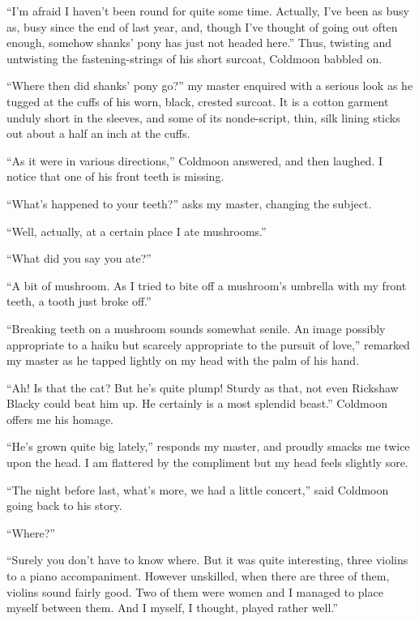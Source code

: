 \documentclass[12pt, openright]{book}
\begin{document}
``I'm afraid I haven't been round for quite some time. Actually, I've
been as busy as, busy since the end of last year, and, though I've
thought of going out often enough, somehow shanks' pony has just not
headed here.'' Thus, twisting and untwisting the fastening-strings of
his short surcoat, Coldmoon babbled on.

``Where then did shanks' pony go?'' my master enquired with a serious
look as he tugged at the cuffs of his worn, black, crested surcoat. It
is a cotton garment unduly short in the sleeves, and some of its
nonde-script, thin, silk lining sticks out about a half an inch at the
cuffs.

``As it were in various directions,'' Coldmoon answered, and then
laughed. I notice that one of his front teeth is missing.

``What's happened to your teeth?'' asks my master, changing the subject.

``Well, actually, at a certain place I ate mushrooms.''

``What did you say you ate?''

``A bit of mushroom. As I tried to bite off a mushroom's umbrella with
my front teeth, a tooth just broke off.''

``Breaking teeth on a mushroom sounds somewhat senile. An image possibly
appropriate to a haiku but scarcely appropriate to the pursuit of
love,'' remarked my master as he tapped lightly on my head with the palm
of his hand.

``Ah! Is that the cat? But he's quite plump! Sturdy as that, not even
Rickshaw Blacky could beat him up. He certainly is a most splendid
beast.'' Coldmoon offers me his homage.

``He's grown quite big lately,'' responds my master, and proud\-ly smacks
me twice upon the head. I am flattered by the compliment but my head
feels slightly sore.

``The night before last, what's more, we had a little concert,'' said
Coldmoon going back to his story.

``Where?''

``Surely you don't have to know where. But it was quite interesting,
three violins to a piano accompaniment. However unskilled, when there
are three of them, violins sound fairly good. Two of them were women and
I managed to place myself between them. And I myself, I thought, played
rather well.''
\end{document}
